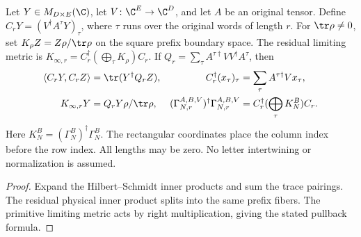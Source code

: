 \begin{definition}
    \label{def:correlated_residual_gram_metric}
    \leanok
    Let $Y\in M_{D\times E}(\C)$, let $V\colon\C^E\to\C^D$, and let
    $A$ be an original tensor. Define $C_rY=(V^\dagger A^\tau Y)_\tau$,
    where $\tau$ runs over the original words of length $r$. For
    $\tr\rho\ne0$, set $K_\rho Z=Z\rho/\tr\rho$ on the square prefix
    boundary space. The residual limiting metric is
    $K_{\infty,r}=C_r^\dagger(\bigoplus_\tau K_\rho)C_r$. If
    $Q_r=\sum_\tau A^{\tau\dagger}VV^\dagger A^\tau$, then
    \begin{align}
        \langle C_rY,C_rZ\rangle & =\tr(Y^\dagger Q_rZ),                  &
        C_r^\dagger(x_\tau)_\tau & =\sum_\tau A^{\tau\dagger}Vx_\tau,       \\
        K_{\infty,r}Y            & =Q_rY\rho/\tr\rho,                     &
        (\Gamma_{N,r}^{A,B,V})^\dagger\Gamma_{N,r}^{A,B,V}
                                 & =C_r^\dagger(\bigoplus_\tau K_N^B)C_r.
    \end{align}
    Here $K_N^B=(\Gamma_N^B)^\dagger\Gamma_N^B$. The rectangular
    coordinates place the column index before the row index. All lengths
    may be zero. No letter intertwining or normalization is assumed.
\end{definition}
\begin{proof}\leanok
    Expand the Hilbert--Schmidt inner products and sum the trace pairings.
    The residual physical inner product splits into the same prefix fibers.
    The primitive limiting metric acts by right multiplication, giving the
    stated pullback formula.
\end{proof}

